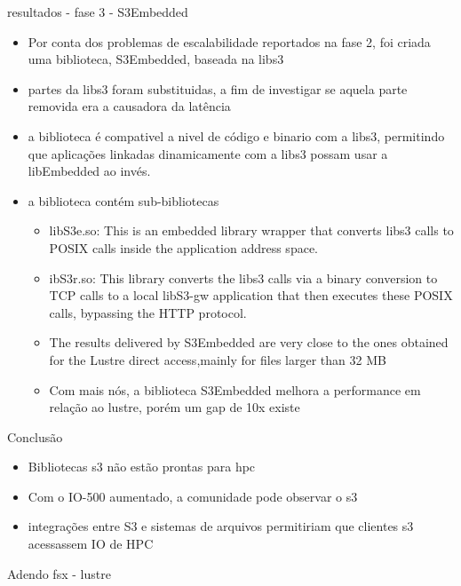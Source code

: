 \documentclass{beamer}
\begin{document}
\begin{frame}{resultados - fase 3 - S3Embedded}
	\begin{itemize}
		\item Por conta dos problemas de escalabilidade reportados na fase 2, foi criada uma biblioteca, S3Embedded, baseada na libs3
		\item partes da libs3 foram substituidas, a fim de investigar se aquela parte removida era a causadora da latência
		\item a biblioteca é compativel a nivel de código e binario com a libs3, permitindo que aplicações linkadas dinamicamente com a libs3 possam usar a libEmbedded ao invés.
		\item a biblioteca contém sub-bibliotecas
		\begin{itemize}
			\item libS3e.so: This is an embedded library wrapper that converts libs3 calls to POSIX calls
			inside the application address space.
			\item ibS3r.so: This library converts the libs3 calls via a binary conversion to TCP calls to a local
			libS3-gw application that then executes these POSIX calls, bypassing the HTTP protocol.
			\item The results delivered by S3Embedded are very close to the ones obtained for the
			Lustre direct access,mainly for files larger than 32 MB
			\item Com mais nós, a biblioteca S3Embedded melhora a performance em relação ao lustre, porém um gap de 10x existe
		\end{itemize}
	\end{itemize}
\end{frame}
\begin{frame}{Conclusão}
	\begin{itemize}
		\item Bibliotecas s3 não estão prontas para hpc
		\item Com o IO-500 aumentado, a comunidade pode observar o s3
		\item integrações entre S3 e sistemas de arquivos permitiriam que clientes s3 acessassem IO de HPC
	\end{itemize}
\end{frame}
\begin{frame}{Adendo}
    fsx - lustre
\end{frame}
\end{document}
